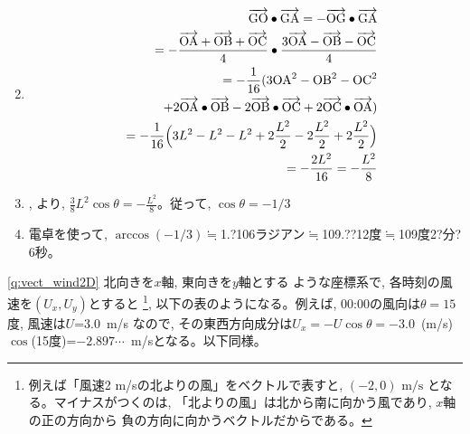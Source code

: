 \begin{enumerate}
\begin{eqnarray*}
\end{eqnarray*}
\item 
\begin{eqnarray*}
&&\overrightarrow{\text{GO}}\bullet\overrightarrow{\text{GA}}=-\overrightarrow{\text{OG}}\bullet\overrightarrow{\text{GA}}\\
&&=-\frac{\overrightarrow{\text{OA}}+\overrightarrow{\text{OB}}+\overrightarrow{\text{OC}}}{4}
\bullet \frac{3\overrightarrow{\text{OA}}-\overrightarrow{\text{OB}}-\overrightarrow{\text{OC}}}{4}\\
&&=-\frac{1}{16}(3\text{OA}^2-\text{OB}^2-\text{OC}^2\\
&&\quad+2\overrightarrow{\text{OA}}\bullet\overrightarrow{\text{OB}}
-2\overrightarrow{\text{OB}}\bullet\overrightarrow{\text{OC}}
+2\overrightarrow{\text{OC}}\bullet\overrightarrow{\text{OA}})\\
&&=-\frac{1}{16}\Bigl(3L^2-L^2-L^2+2\frac{L^2}{2}-2\frac{L^2}{2}+2\frac{L^2}{2}\Bigr)\\
&&=-\frac{2L^2}{16}=-\frac{L^2}{8}
\end{eqnarray*}
\item {}, より, 
$\frac{3}{8}L^2\cos\theta = -\frac{L^2}{8}$。従って, $\cos\theta=-1/3$
\item 電卓を使って, $\arccos (-1/3)\fallingdotseq$1.?106ラジアン$\fallingdotseq$109.??12度$\fallingdotseq$109度2?分?6秒。
\end{enumerate}
\hv

% 
\ref{q:vect_wind2D} 北向きを$x$軸, 東向きを$y$軸とする
ような座標系で, 各時刻の風速を$(U_x, U_y)$とすると
\footnote{例えば「風速2 m/sの北よりの風」をベクトルで表すと, $(-2, 0)\,\,\text{m/s}$
となる。マイナスがつくのは, 「北よりの風」は北から南に向かう風であり, $x$軸の正の方向から
負の方向に向かうベクトルだからである。}, 以下の表のようになる。例えば, 00:00の風向は$\theta=15$度, 風速は$U$=3.0~m/s
なので, その東西方向成分は$U_x=-U\cos\theta=-3.0$~(m/s)~$\cos$(15度)=$-2.897\cdots$~m/sとなる。以下同様。

